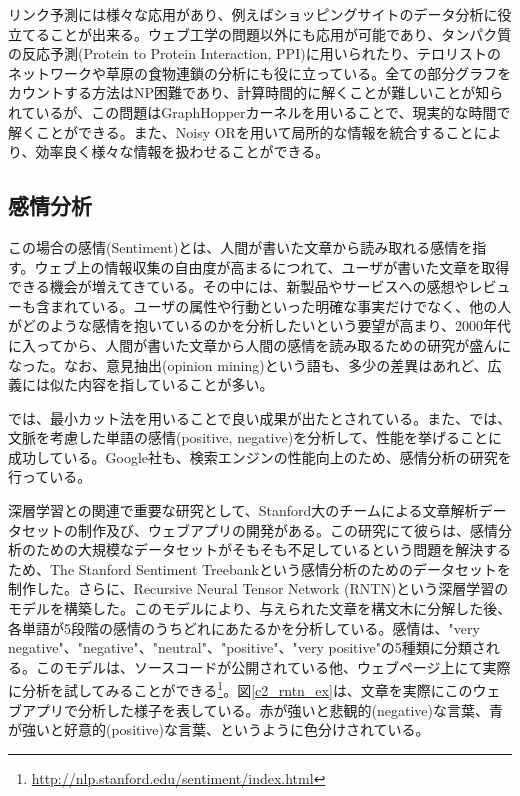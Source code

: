 リンク予測には様々な応用があり、例えばショッピングサイトのデータ分析に役立てることが出来る\cite{clauset2004finding}。ウェブ工学の問題以外にも応用が可能であり、タンパク質の反応予測(Protein to Protein Interaction, PPI)に用いられたり\cite{bader2003gaining}、テロリストのネットワークや草原の食物連鎖の分析にも役に立っている\cite{clauset2008hierarchical}。全ての部分グラフをカウントする方法はNP困難であり、計算時間的に解くことが難しいことが知られている\cite{gartner2003on-graph}が、この問題はGraphHopperカーネルを用いることで、現実的な時間で解くことができる\cite{feragen2013scalable}。また、Noisy ORを用いて局所的な情報を統合することにより、効率良く様々な情報を扱わせることができる\cite{changpinyo2013similarity}。

\subsection{感情分析}
この場合の感情(Sentiment)とは、人間が書いた文章から読み取れる感情を指す。ウェブ上の情報収集の自由度が高まるにつれて、ユーザが書いた文章を取得できる機会が増えてきている。その中には、新製品やサービスへの感想やレビューも含まれている。ユーザの属性や行動といった明確な事実だけでなく、他の人がどのような感情を抱いているのかを分析したいという要望が高まり、2000年代に入ってから、人間が書いた文章から人間の感情を読み取るための研究が盛んになった。なお、意見抽出(opinion mining)という語も、多少の差異はあれど、広義には似た内容を指していることが多い\cite{pang2008opinion}。\par
\cite{pang2004a-sentimental}では、最小カット法を用いることで良い成果が出たとされている。また、\cite{wilson2005recognizing}では、文脈を考慮した単語の感情(positive, negative)を分析して、性能を挙げることに成功している。Google社も、検索エンジンの性能向上のため、感情分析の研究を行っている\cite{godbole2007large-scale}。\par
深層学習との関連で重要な研究として、Stanford大のチームによる文章解析データセットの制作及び、ウェブアプリの開発がある\cite{socher2013recursive}。この研究にて彼らは、感情分析のための大規模なデータセットがそもそも不足しているという問題を解決するため、The Stanford Sentiment Treebankという感情分析のためのデータセットを制作した。さらに、Recursive Neural Tensor Network (RNTN)という深層学習のモデルを構築した。このモデルにより、与えられた文章を構文木に分解した後、各単語が5段階の感情のうちどれにあたるかを分析している。感情は、"very negative"、"negative"、"neutral"、"positive"、"very positive"の5種類に分類される。このモデルは、ソースコードが公開されている他、ウェブページ上にて実際に分析を試してみることができる\footnote{\url{http://nlp.stanford.edu/sentiment/index.html}}。図\ref{c2_rntn_ex}は、文章を実際にこのウェブアプリで分析した様子を表している。赤が強いと悲観的(negative)な言葉、青が強いと好意的(positive)な言葉、というように色分けされている。

